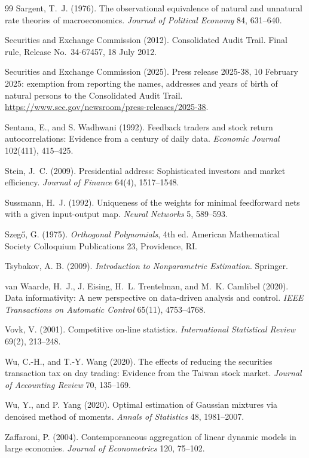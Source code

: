 \documentclass[12pt]{article}
\theoremstyle{definition}
\theoremstyle{remark}
\begin{document}
\begin{thebibliography}{99}
 Sargent, T.~J. (1976). The observational equivalence of natural and unnatural rate theories of macroeconomics. \emph{Journal of Political Economy} 84, 631--640.

 Securities and Exchange Commission (2012). Consolidated Audit Trail. Final rule, Release No.~34-67457, 18 July 2012.

 Securities and Exchange Commission (2025). Press release 2025-38, 10 February 2025: exemption from reporting the names, addresses and years of birth of natural persons to the Consolidated Audit Trail. \url{https://www.sec.gov/newsroom/press-releases/2025-38}.

 Sentana, E., and S. Wadhwani (1992). Feedback traders and stock return autocorrelations: Evidence from a century of daily data. \emph{Economic Journal} 102(411), 415--425.

 Stein, J.~C. (2009). Presidential address: Sophisticated investors and market efficiency. \emph{Journal of Finance} 64(4), 1517--1548.

 Sussmann, H.~J. (1992). Uniqueness of the weights for minimal feedforward nets with a given input-output map. \emph{Neural Networks} 5, 589--593.

 Szeg\H{o}, G. (1975). \emph{Orthogonal Polynomials}, 4th ed. American Mathematical Society Colloquium Publications 23, Providence, RI.

 Tsybakov, A. B. (2009). \emph{Introduction to Nonparametric Estimation}. Springer.

 van Waarde, H.~J., J. Eising, H.~L. Trentelman, and M.~K. Camlibel (2020). Data informativity: A new perspective on data-driven analysis and control. \emph{IEEE Transactions on Automatic Control} 65(11), 4753--4768.

 Vovk, V. (2001). Competitive on-line statistics. \emph{International Statistical Review} 69(2), 213--248.

 Wu, C.-H., and T.-Y. Wang (2020). The effects of reducing the securities transaction tax on day trading: Evidence from the Taiwan stock market. \emph{Journal of Accounting Review} 70, 135--169.

 Wu, Y., and P. Yang (2020). Optimal estimation of Gaussian mixtures via denoised method of moments. \emph{Annals of Statistics} 48, 1981--2007.

 Zaffaroni, P. (2004). Contemporaneous aggregation of linear dynamic models in large economies. \emph{Journal of Econometrics} 120, 75--102.
\end{thebibliography}
\end{document}
